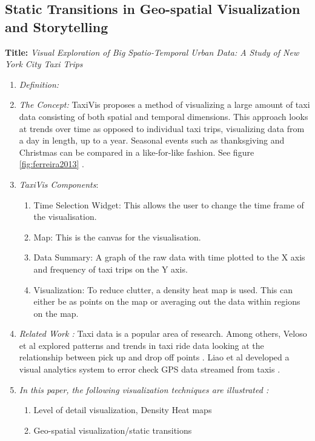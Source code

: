 \documentclass{egpubl}
\begin{document}
\subsection{Static Transitions in Geo-spatial Visualization and Storytelling}
\textbf{Title:} \textit{Visual Exploration of Big Spatio-Temporal Urban Data: A Study of New York City Taxi Trips} 
\begin{enumerate}
\item \textit{Definition:} 
\item \textit{The Concept:} TaxiVis proposes a method of visualizing a large amount of taxi data consisting of both spatial and temporal dimensions. This approach looks at trends over time as opposed to individual taxi trips, visualizing data from a day in length, up to a year. Seasonal events such as thanksgiving and Christmas can be compared in a like-for-like fashion. See figure \ref{fig:ferreira2013} \cite{ferreira2013}.
\item \textit{TaxiVis Components}:
\begin{enumerate}
\item Time Selection Widget: This allows the user to change the time frame of the visualisation. 
\item Map: This is the canvas for the visualisation.
\item Data Summary: A graph of the raw data with time plotted to the X axis and frequency of taxi trips on the Y axis.
\item Visualization: To reduce clutter, a density heat map is used. This can either be as points on the map or averaging out the data within regions on the map. 
\end{enumerate}
\item \textit{Related Work :}  Taxi data is a popular area of research. Among others, Veloso et al explored patterns and trends in taxi ride data looking at the relationship between pick up and drop off points \cite{veloso2011,Veloso}. Liao et al developed a visual analytics system to error check GPS data streamed from taxis \cite{liao2010}. 
\item \textit{In this paper, the following visualization techniques are illustrated :} 
\begin{enumerate}
\item Level of detail visualization, Density Heat maps
\item Geo-spatial visualization/static transitions
\end{enumerate}
\end{enumerate}
\begingroup
\end{document}
